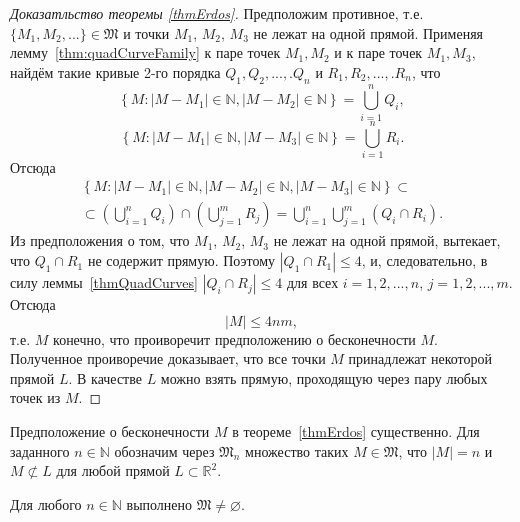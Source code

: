 \begin{proof}[Доказатльство теоремы \ref{thmErdos}]
	Предположим противное,
	т.е. $\{M_1, M_2, ... \}\in\mathfrak{M}$
	и точки $M_1$, $M_2$, $M_3$ не лежат на одной прямой.
	Применяя лемму~\ref{thm:quadCurveFamily}
	к паре точек $M_1, M_2$ и к паре точек $M_1, M_3$,
	найдём такие кривые 2-го порядка
	$Q_1, Q_2,...,.Q_n$ и $R_1, R_2,...,.R_n$, что
	\begin{equation*}
		\left\{
			M: |M-M_1|\in\mathbb{N}, |M-M_2|\in\mathbb{N}
		\right\}
		=\bigcup_{i=1}^n Q_i
		,
	\end{equation*}
	\begin{equation*}
		\left\{
			M: |M-M_1|\in\mathbb{N}, |M-M_3|\in\mathbb{N}
		\right\}
		=\bigcup_{i=1}^n R_i
		.
	\end{equation*}
	Отсюда
	\begin{multline*}
		\left\{
			M:
			|M-M_1|\in\mathbb{N},
			|M-M_2|\in\mathbb{N},
			|M-M_3|\in\mathbb{N}
		\right\}
		\subset
		\\ \subset
		\left(\bigcup_{i=1}^n Q_i\right)
		\cap
		\left(\bigcup_{j=1}^m R_j\right)
		=
		\bigcup_{i=1}^n \bigcup_{j=1}^m \left( Q_i \cap R_i \right)
		.
	\end{multline*}
	Из предположения о том, что $M_1$, $M_2$, $M_3$
	не лежат на одной прямой, вытекает,
	что $Q_1\cap R_1$ не содержит прямую.
	Поэтому $|Q_1\cap R_1|\leqslant 4$,
	и, следовательно, в силу леммы~\ref{thmQuadCurves}
	$|Q_i\cap R_j|\leqslant 4$
	для всех $i=1,2,...,n$, $j=1,2,...,m$.
	Отсюда
	\begin{equation*}
		|M| \leqslant 4nm
		,
	\end{equation*}
	т.е. $M$ конечно,
	что проиворечит предположению о бесконечности $M$.
	Полученное проиворечие доказывает, что все точки $M$
	принадлежат некоторой прямой $L$.
	В качестве $L$ можно взять прямую,
	проходящую через пару любых точек из $M$.
\end{proof}

Предположение о бесконечности $M$ в теореме~\ref{thmErdos} существенно.
Для заданного $n\in\mathbb{N}$ обозначим через $\mathfrak{M}_n$
множество таких $M\in\mathfrak{M}$, что
$|M|=n$ и $M \not\subset L$ для любой прямой $L \subset\mathbb{R}^2$.

\begin{theorem}
	Для любого $n\in\mathbb{N}$ выполнено $\mathfrak{M}\neq\varnothing$.
\end{theorem}

